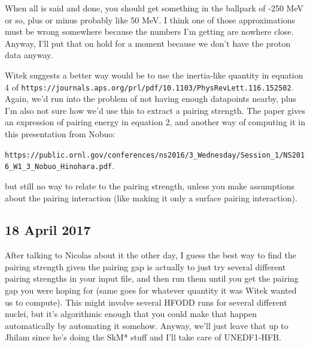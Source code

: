 \noindent When all is said and done, you should get something in the ballpark of -250 MeV or so, plus or minus probably like 50 MeV. I think one of those approximations must be wrong somewhere because the numbers I'm getting are nowhere close. Anyway, I'll put that on hold for a moment because we don't have the proton data anyway.

Witek suggests a better way would be to use the inertia-like quantity in equation 4 of \verb|https://journals.aps.org/prl/pdf/10.1103/PhysRevLett.116.152502|. Again, we'd run into the problem of not having enough datapoints nearby, plus I'm also not sure how we'd use this to extract a pairing strength. The paper gives an expression of pairing energy in equation 2, and another way of computing it in this presentation from Nobuo:

\noindent\verb|https://public.ornl.gov/conferences/ns2016/3_Wednesday/Session_1/NS2016_W1_3_Nobuo_Hinohara.pdf|.

\noindent but still no way to relate to the pairing strength, unless you make assumptions about the pairing interaction (like making it only a surface pairing interaction).

\subsection*{18 April 2017}
After talking to Nicolas about it the other day, I guess the best way to find the pairing strength given the pairing gap is actually to just try several different pairing strengths in your input file, and then run them until you get the pairing gap you were hoping for (same goes for whatever quantity it was Witek wanted us to compute). This might involve several HFODD runs for several different nuclei, but it's algorithmic enough that you could make that happen automatically by automating it somehow. Anyway, we'll just leave that up to Jhilam since he's doing the SkM* stuff and I'll take care of UNEDF1-HFB.

